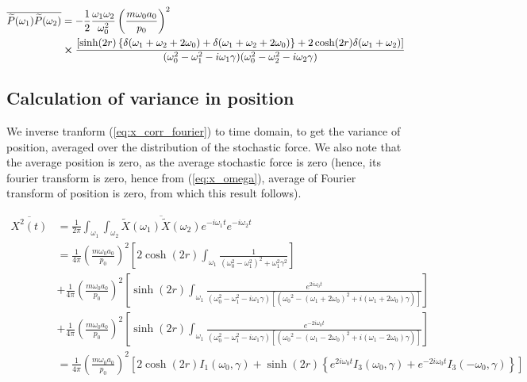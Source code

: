 \documentclass[12pt, twoside]{article}
\begin{document}
\begin{equation}\begin{aligned}
\overline{\widetilde { P } ( \omega_1 )\widetilde { P } ( \omega_2 )} & = -\frac{1}{2}\frac{\omega_1 \omega_2}{\omega_{ 0 } ^2} \left(\frac { m \omega_0 a_0 } { p _ { 0 } }\right)^2 \\&\cross \frac{\left[\sinh(2r)\left\{\delta(\omega_1 + \omega_2 + 2\omega_0)+\delta(\omega_1 + \omega_2 + 2\omega_0)\right\} + 2\cosh(2r)\delta(\omega_1 + \omega_2)\right]}{( \omega _ { 0 } ^ { 2 } - \omega_1 ^ { 2 } - i \omega_1 \gamma)(\omega _ { 0 } ^ { 2 } - \omega_2 ^ { 2 } - i \omega_2 \gamma)}\end{aligned}
\end{equation}
\subsection{Calculation of variance in position}

We inverse tranform (\ref{eq:x_corr_fourier}) to time domain, to get the variance of position, averaged over the distribution of the stochastic force. We also note that the average position is zero, as the average stochastic force is zero (hence, its fourier transform is zero, hence from (\ref{eq:x_omega}), average of Fourier transform of position is zero, from which this result follows).

$\begin{aligned} \overline{X ^ { 2 } ( t )} &= \frac { 1 } { 2 \pi } \int _ { \omega _ { 1 }}\int_{\omega_2} \overline{\widetilde { X } ( \omega_1 )\widetilde { X } ( \omega_2 )}  e ^ { - i \omega _ { 1 } t } e ^ { - i \omega _ { 2 } t } \\ &= \frac{1}{4\pi}\left(\frac { m \omega _ { 0 } a_0 } { p _ { 0 } }\right)^2 \left[ 2 \cosh(2r) \int_{\omega_1} \frac{1}{(\omega_0^2 - \omega_1 ^2)^2 + \omega_1 ^2 \gamma^2}\right] \\&+ \frac{1}{4\pi}\left(\frac { m \omega _ { 0 } a_0 } { p _ { 0 } }\right)^2 \left[ \sinh(2r) \int_{\omega_1} \frac{e^{2i\omega_0 t}}{(\omega_0^2 - \omega_1 ^2 - i\omega_1\gamma) [({\omega_0}^2 - (\omega_1 + 2\omega_0)^2 + i(\omega_1 + 2 \omega_0) \gamma)]}\right]
\\&+ \frac{1}{4\pi}\left(\frac { m \omega _ { 0 } a_0 } { p _ { 0 } }\right)^2 \left[ \sinh(2r) \int_{\omega_1} \frac{e^{-2i\omega_0 t}}{(\omega_0^2 - \omega_1 ^2 - i\omega_1\gamma) [({\omega_0}^2 - (\omega_1 - 2\omega_0)^2 + i(\omega_1 - 2 \omega_0) \gamma)]}\right] \\ & = \frac{1}{4\pi}\left(\frac { m \omega _ { 0 } a_0 } { p _ { 0 } }\right)^2 \left[ 2 \cosh(2r) I_1(\omega_0,\gamma) + \sinh(2r) \left\{e^{2i\omega_0 t}I_3(\omega_0,\gamma) + e^{-2i\omega_0 t}I_3(-\omega_0,\gamma)\right\}\right]
\end{aligned}$
\end{document}
